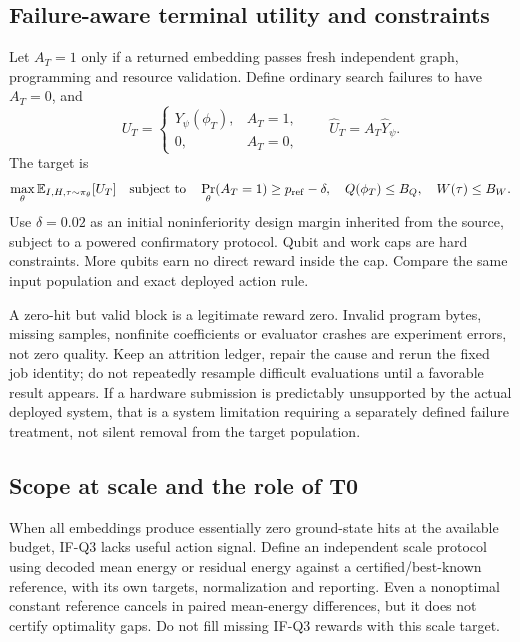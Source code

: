 \documentclass[11pt,a4paper]{article}
\newcommand{\E}{\mathbb{E}}
\theoremstyle{definition}\newtheorem{definition}[proposition]{Definition}
\begin{document}
\subsection{Failure-aware terminal utility and constraints}
Let $A_T=1$ only if a returned embedding passes fresh independent graph, programming and resource validation. Define ordinary search failures to have $A_T=0$, and
\begin{equation}
U_T=\begin{cases}Y_\psi(\phi_T),&A_T=1,\\0,&A_T=0,\end{cases}
\qquad \widehat U_T=A_T\widehat Y_\psi.
\label{eq:utility}
\end{equation}
The target is
\begin{equation}
\max_\theta \E_{I,H,\tau\sim\pi_\theta}[U_T]
\quad\text{subject to}\quad
\Pr_\theta(A_T=1)\ge p_{\rm ref}-\delta,
\quad Q(\phi_T)\le B_Q,
\quad W(\tau)\le B_W.
\end{equation}
Use $\delta=0.02$ as an initial noninferiority design margin inherited from the source, subject to a powered confirmatory protocol. Qubit and work caps are hard constraints. More qubits earn no direct reward inside the cap. Compare the same input population and exact deployed action rule.

A zero-hit but valid block is a legitimate reward zero. Invalid program bytes, missing samples, nonfinite coefficients or evaluator crashes are experiment errors, not zero quality. Keep an attrition ledger, repair the cause and rerun the fixed job identity; do not repeatedly resample difficult evaluations until a favorable result appears. If a hardware submission is predictably unsupported by the actual deployed system, that is a system limitation requiring a separately defined failure treatment, not silent removal from the target population.

\subsection{Scope at scale and the role of T0}
When all embeddings produce essentially zero ground-state hits at the available budget, IF-Q3 lacks useful action signal. Define an independent scale protocol using decoded mean energy or residual energy against a certified/best-known reference, with its own targets, normalization and reporting. Even a nonoptimal constant reference cancels in paired mean-energy differences, but it does not certify optimality gaps. Do not fill missing IF-Q3 rewards with this scale target.
\end{document}
